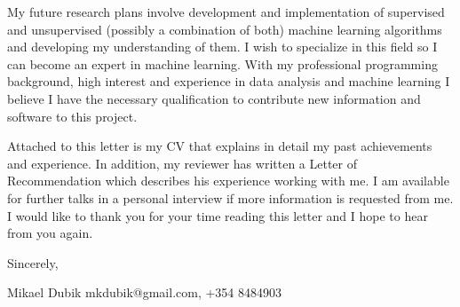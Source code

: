 My future research plans involve development and implementation of supervised and unsupervised (possibly a combination of both) machine learning algorithms and developing my understanding of them. I wish to specialize in this field so I can become an expert in machine learning. With my professional programming background, high interest and experience in data analysis and machine learning I believe I have the necessary qualification to contribute new information and software to this project.

Attached to this letter is my CV that explains in detail my past achievements and experience. In addition, my reviewer has written a Letter of Recommendation which describes his experience working with me. I am available for further talks in a personal interview if more information is requested from me. I would like to thank you for your time reading this letter and I hope to hear from you again.

Sincerely,




Mikael Dubik  
mkdubik@gmail.com, +354 8484903

